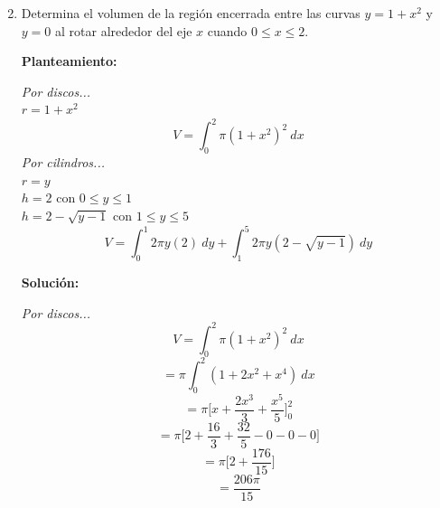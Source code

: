 \documentclass[10pt,letterpaper]{article}
\begin{document}
\begin{enumerate}
\begin{multicols}{2}
\end{multicols}

\newpage

\item Determina el volumen de la región encerrada entre las curvas $y = 1 + x^2$ y $y = 0$ al rotar
      alrededor del eje $x$ cuando $0 \leq x \leq 2$.

\begin{multicols}{2}


\textbf{Planteamiento:}

\textit{Por discos...} \\
$r = 1+x^2$ \\
$$V = \int_{0}^{2} \pi (1+x^2)^2\ dx$$
\textit{Por cilindros...} \\
$r = y$ \\
$h = 2$ con $0 \leq y \leq 1$ \\
$h = 2 - \sqrt{y-1}$ con $1 \leq y \leq 5$
$$V = \int_{0}^{1} 2\pi y (2)\ dy + \int_{1}^{5} 2\pi y (2-\sqrt{y-1})\ dy$$

\textbf{Solución:}

\textit{Por discos...}
$$V = \int_{0}^{2} \pi (1+x^2)^2\ dx$$
$$= \pi \int_{0}^{2} (1 + 2x^2 + x^4)\ dx$$
$$= \pi \bigg[ x + \frac{2x^3}{3} + \frac{x^5}{5} \bigg]_{0}^{2}$$
$$= \pi \bigg[ 2 + \frac{16}{3} + \frac{32}{5} - 0 - 0 - 0 \bigg]$$
$$= \pi \bigg[ 2 + \frac{176}{15} \bigg]$$
$$= \frac{206\pi}{15}$$



\end{multicols}
\end{enumerate}
\end{document}
